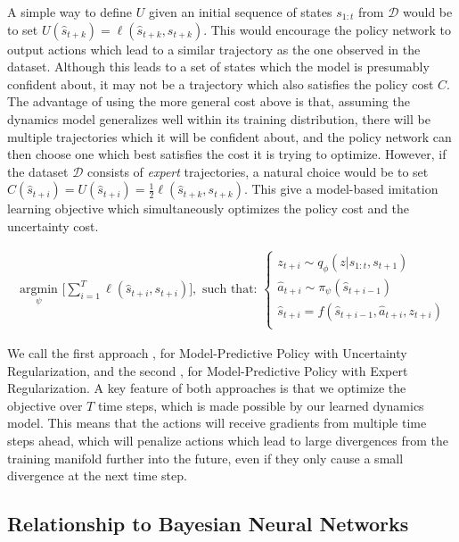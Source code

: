 \documentclass{article} %
\begin{document}
A simple way to define $U$ given an initial sequence of states $s_{1:t}$ from $\mathcal{D}$ would be to set $U(\hat{s}_{t+k}) = \ell(\hat{s}_{t+k}, s_{t+k})$.
This would encourage the policy network to output actions which lead to a similar trajectory as the one observed in the dataset.
Although this leads to a set of states which the model is presumably confident about, it may not be a trajectory which also satisfies the policy cost $\textit{C}$.
The advantage of using the more general cost above is that, assuming the dynamics model generalizes well within its training distribution, there will be multiple trajectories which it will be confident about, and the policy network can then choose one which best satisfies the cost it is trying to optimize.
However, if the dataset $\mathcal{D}$ consists of \textit{expert} trajectories, a natural choice would be to set $C(\hat{s}_{t+i}) = U(\hat{s}_{t+i}) = \frac{1}{2} \ell(\hat{s}_{t+k}, s_{t+k})$. This give a model-based imitation learning objective which simultaneously optimizes the policy cost and the uncertainty cost.


        \begin{align*}
    \underset{\psi}{\mbox{ argmin }} \Big[ \sum_{i=1}^{T} \ell(\hat{s}_{t+i}, s_{t+i}) \Big],  \mbox{ such that: }
    \begin{cases}
      z_{t+i} \sim q_\phi(z | s_{1:t}, s_{t+1}) \\
      \hat{a}_{t+i} \sim \pi_\psi(\hat{s}_{t+i-1}) \\
      \hat{s}_{t+i} = f(\hat{s}_{t+i-1}, \hat{a}_{t+i}, z_{t+i}) \\
      \end{cases}
        \end{align*}

        We call the first approach \modelnamedrop, for Model-Predictive Policy with Uncertainty Regularization, and the second \modelnameil, for Model-Predictive Policy with Expert Regularization.
        A key feature of both approaches is that we optimize the objective over $T$ time steps, which is made possible by our learned dynamics model.
        This means that the actions will receive gradients from multiple time steps ahead, which will penalize actions which lead to large divergences from the training manifold further into the future, even if they only cause a small divergence at the next time step.

\subsection{Relationship to Bayesian Neural Networks}
\end{document}
